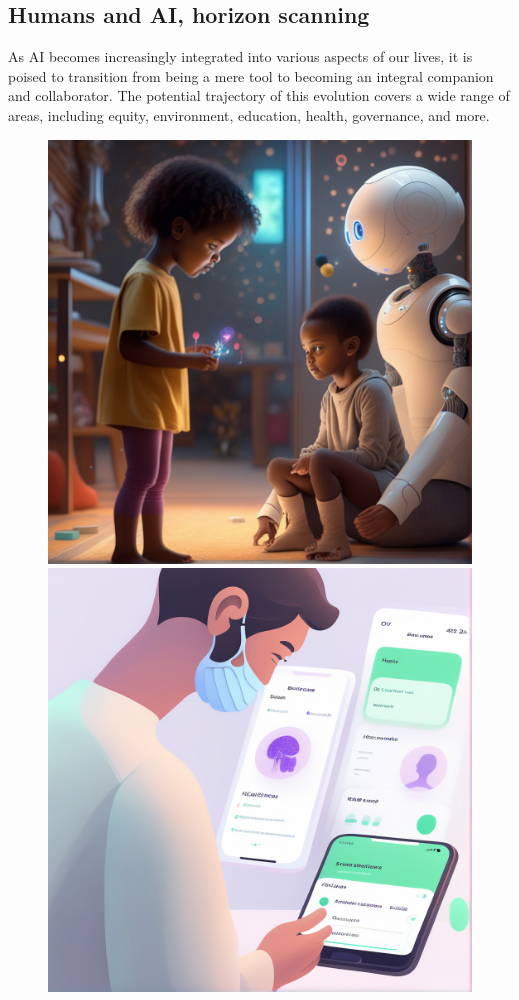 \subsection{Humans and AI, horizon scanning}
As AI becomes increasingly integrated into various aspects of our lives, it is poised to transition from being a mere tool to becoming an integral companion and collaborator. The potential trajectory of this evolution covers a wide range of areas, including equity, environment, education, health, governance, and more.
\begin{figure}[ht]
\centering
\includegraphics{base_output_00002_.png}
\hfill
\includegraphics{base_output_00003_.png}

\end{figure}
